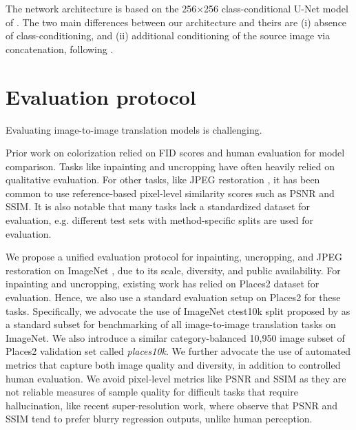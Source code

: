 The network architecture is based on the 256$\times$256 class-conditional U-Net model of \cite{dhariwal2021diffusion}. The two main differences between our architecture and theirs are (i) absence of class-conditioning, and (ii) additional conditioning of the source image via concatenation, following \cite{saharia2021image}.

\section{Evaluation protocol}

Evaluating image-to-image translation models is challenging.

Prior work on colorization \citep{zhang2016colorful, guadarrama2017pixcolor, coltran}  relied on FID scores and human evaluation for model comparison. Tasks like inpainting \citep{yu2019free, yu2018generative} and uncropping \citep{teterwak2019boundless, wang2019wide} have often heavily relied on qualitative evaluation. For other tasks, like JPEG restoration \citep{dong2015compression,liu2018multi,galteri2019deep}, it has been common to use reference-based pixel-level similarity scores such as PSNR and SSIM. It is also notable that many tasks lack a standardized dataset for evaluation, e.g. different test sets with method-specific splits are used for evaluation.

We propose a unified evaluation protocol for inpainting, uncropping, and JPEG restoration on ImageNet \citep{deng2009imagenet}, due to its scale, diversity, and public availability. For inpainting and uncropping, existing work has relied on Places2 dataset \citep{zhou2017places} for evaluation. Hence, we also use a standard evaluation setup on Places2 for these tasks. Specifically, we advocate the use of ImageNet ctest10k split proposed by \cite{larsson2016learning} as a standard subset for benchmarking of all image-to-image translation tasks on ImageNet. We also introduce a similar category-balanced 10,950 image subset of Places2 validation set called \textit{places10k}. We further advocate the use of automated metrics that capture both image quality and diversity, in addition to controlled human evaluation. We avoid pixel-level metrics like PSNR and SSIM as they  are not reliable measures of sample quality for difficult tasks that require hallucination, like recent super-resolution work, where \citep{ledig2017photo, dahl2017pixel, menon2020pulse} observe that PSNR and SSIM tend to prefer blurry regression outputs, unlike human perception.


